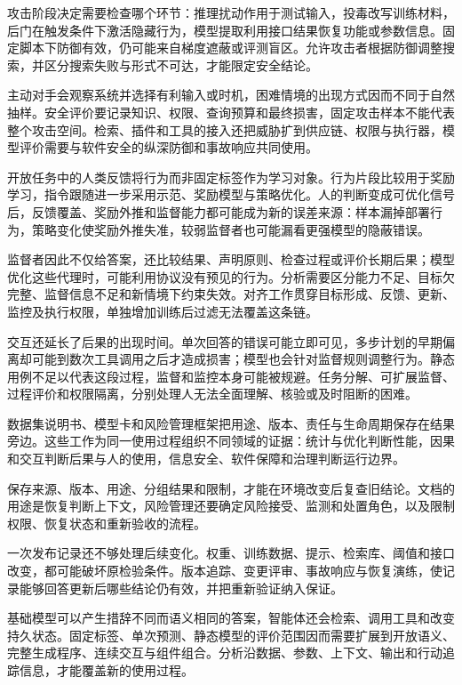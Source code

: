 攻击阶段决定需要检查哪个环节：推理扰动作用于测试输入，投毒改写训练材料，后门在触发条件下激活隐藏行为，模型提取利用接口结果恢复功能或参数信息。固定脚本下防御有效，仍可能来自梯度遮蔽或评测盲区。允许攻击者根据防御调整搜索，并区分搜索失败与形式不可达，才能限定安全结论。

主动对手会观察系统并选择有利输入或时机，困难情境的出现方式因而不同于自然抽样。安全评价要记录知识、权限、查询预算和最终损害，固定攻击样本不能代表整个攻击空间。检索、插件和工具的接入还把威胁扩到供应链、权限与执行器，模型评价需要与软件安全的纵深防御和事故响应共同使用。

开放任务中的人类反馈将行为而非固定标签作为学习对象。行为片段比较用于奖励学习，指令跟随进一步采用示范、奖励模型与策略优化。人的判断变成可优化信号后，反馈覆盖、奖励外推和监督能力都可能成为新的误差来源：样本漏掉部署行为，策略变化使奖励外推失准，较弱监督者也可能漏看更强模型的隐蔽错误。

监督者因此不仅给答案，还比较结果、声明原则、检查过程或评价长期后果；模型优化这些代理时，可能利用协议没有预见的行为。分析需要区分能力不足、目标欠完整、监督信息不足和新情境下约束失效。对齐工作贯穿目标形成、反馈、更新、监控及执行权限，单独增加训练后过滤无法覆盖这条链。

交互还延长了后果的出现时间。单次回答的错误可能立即可见，多步计划的早期偏离却可能到数次工具调用之后才造成损害；模型也会针对监督规则调整行为。静态用例不足以代表这段过程，监督和监控本身可能被规避。任务分解、可扩展监督、过程评价和权限隔离，分别处理人无法全面理解、核验或及时阻断的困难。

数据集说明书、模型卡和风险管理框架把用途、版本、责任与生命周期保存在结果旁边。这些工作为同一使用过程组织不同领域的证据：统计与优化判断性能，因果和交互判断后果与人的使用，信息安全、软件保障和治理判断运行边界。

保存来源、版本、用途、分组结果和限制，才能在环境改变后复查旧结论。文档的用途是恢复判断上下文，风险管理还要确定风险接受、监测和处置角色，以及限制权限、恢复状态和重新验收的流程。

一次发布记录还不够处理后续变化。权重、训练数据、提示、检索库、阈值和接口改变，都可能破坏原检验条件。版本追踪、变更评审、事故响应与恢复演练，使记录能够回答更新后哪些结论仍有效，并把重新验证纳入保证。

基础模型可以产生措辞不同而语义相同的答案，智能体还会检索、调用工具和改变持久状态。固定标签、单次预测、静态模型的评价范围因而需要扩展到开放语义、完整生成程序、连续交互与组件组合。分析沿数据、参数、上下文、输出和行动追踪信息，才能覆盖新的使用过程。

